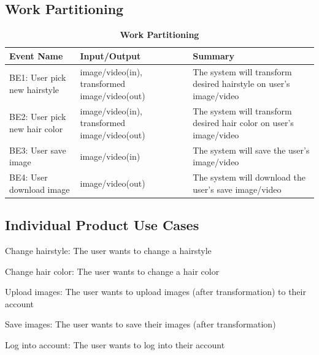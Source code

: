 \documentclass[12pt]{article}
\begin{document}
\subsection{Work Partitioning}
\begin{flushleft}
\begin{table}[bp hp]
\caption{\bf Work Partitioning}
    \begin{tabularx}{\linewidth}{|l|X|X|}
        \toprule {\bf Event Name} & {\bf Input/Output} & {\bf Summary}\\
        \midrule
        BE1: User pick new hairstyle & image/video(in), transformed image/video(out) & The system will transform desired hairstyle on user's image/video\\
        \hline
        BE2: User pick new hair color & image/video(in), transformed image/video(out) & The system will transform desired hair color on user's image/video\\
        \hline
        BE3: User save image & image/video(in) & The system will save the user's image/video\\
        \hline
        BE4: User download image & image/video(out) & The system will download the user's save image/video\\
        \bottomrule
    \end{tabularx}
\end{table}
\end{flushleft}

\subsection{Individual Product Use Cases}
\begin{UC}
    \item Change hairstyle: The user wants to change a hairstyle
    \item Change hair color: The user wants to change a hair color
    \item Upload images: The user wants to upload images (after transformation) to their account
    \item Save images: The user wants to save their images (after transformation)
    \item Log into account: The user wants to log into their account
\end{UC}
\end{document}
